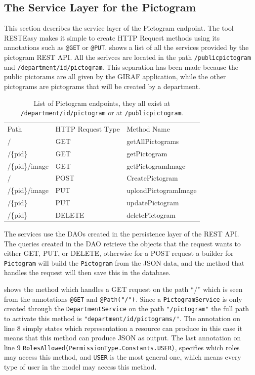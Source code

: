 \subsection{The Service Layer for the Pictogram}
This section describes the service layer of the Pictogram endpoint.
The tool RESTEasy makes it simple to create HTTP Request methods using its annotations such as \texttt{@GET} or \texttt{@PUT}.
 shows a list of all the services provided by the pictogram REST API.
All the serivces are located in the path \texttt{/publicpictogram} and \texttt{/department/{id}/pictogram}.
This separation has been made because the public pictorams are all given by the GIRAF application, while the other pictograms are pictograms that will be created by a department.

\begin{table}[]
\centering
\caption{List of Pictogram endpoints, they all exist at \texttt{/department/id/pictogram} or at \texttt{/publicpictogram}.}
\label{tbl:pictogramservice}
\begin{tabular}{lll}
Path           & HTTP Request Type & Method Name          \\
/              & GET               & getAllPictograms     \\
/\{pid\}       & GET               & getPictogram         \\
/\{pid\}/image & GET               & getPictogramImage    \\
/              & POST              & CreatePictogram      \\
/\{pid\}/image & PUT               & uploadPictogramImage \\
/\{pid\}       & PUT               & updatePictogram      \\
/\{pid\}	   & DELETE			   & deletePictogram	  \\
\end{tabular}
\end{table}

The services use the DAOs created in the persistence layer of the REST API.
The queries created in the DAO retrieve the objects that the request wants to either GET, PUT, or DELETE, otherwise for a POST request a builder for \texttt{Pictogram} will build the \texttt{Pictogram} from the JSON data, and the method that handles the request will then save this in the database.

 shows the method which handles a GET request on the path ``/'' which is seen from the annotations \texttt{@GET} and \texttt{@Path("/")}.
Since a \texttt{PictogramService} is only created through the \texttt{DepartmentService} on the path \texttt{"/pictogram"} the full path to activate this method is \texttt{"department/{id}/pictograms/"}.
The annotation on line 8 simply states which representation a resource can produce in this case it means that this method can produce JSON as output.
The last annotation on line 9 \texttt{RolesAllowed({PermissionType.Constants.USER})}, specifies which roles may access this method, and \texttt{USER} is the most general one, which means every type of user in the model may access this method.

